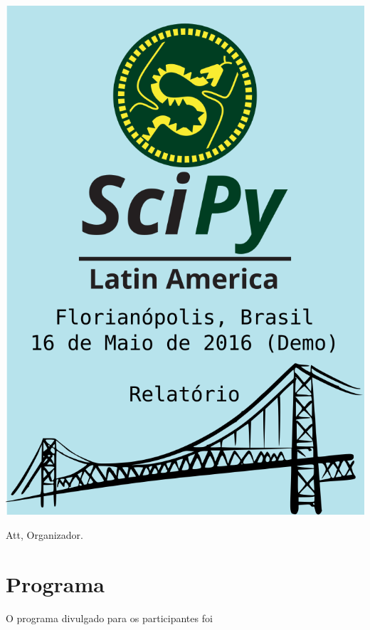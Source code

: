 \documentclass[12pt]{article}
\begin{document}
\thispagestyle{empty}
\noindent  %
\includegraphics{capa}
\NoBgThispage

\clearpage

\restoregeometry

\newpage


Att,
Organizador.

\newpage

\section*{Programa}

O programa divulgado para os participantes foi
\end{document}
